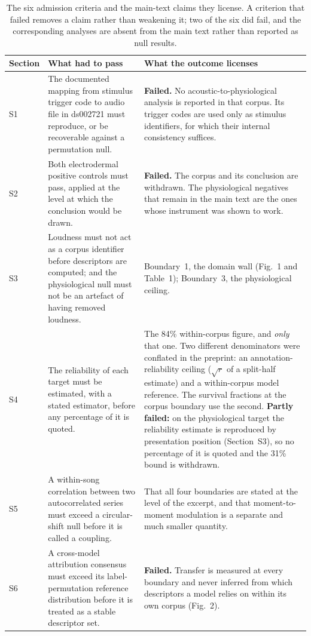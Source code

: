\begin{table}[htbp]
\centering\small
\caption{The six admission criteria and the main-text claims they license. A criterion
that failed removes a claim rather than weakening it; two of the six did fail, and the
corresponding analyses are absent from the main text rather than reported as null
results.}
\begin{tabular}{p{1.0cm}p{5.8cm}p{7.2cm}}
\toprule
Section & What had to pass & What the outcome licenses \\
\midrule
S1 & The documented mapping from stimulus trigger code to audio file in ds002721 must
reproduce, or be recoverable against a permutation null.
& \textbf{Failed.} No acoustic-to-physiological analysis is reported in that corpus.
Its trigger codes are used only as stimulus identifiers, for which their internal
consistency suffices. \\
\addlinespace
S2 & Both electrodermal positive controls must pass, applied at the level
at which the conclusion would be drawn.
& \textbf{Failed.} The corpus and its conclusion are withdrawn. The physiological
negatives that remain in the main text are the ones whose instrument was shown to
work. \\
\addlinespace
S3 & Loudness must not act as a corpus identifier before descriptors are computed; and
the physiological null must not be an artefact of having removed loudness.
& Boundary~1, the domain wall (Fig.~1 and Table~1); Boundary~3, the physiological
ceiling. \\
\addlinespace
S4 & The reliability of each target must be estimated, with a stated estimator, before
any percentage of it is quoted.
& The 84\% within-corpus figure, and \emph{only} that one. Two different denominators
were conflated in the preprint: an annotation-reliability ceiling ($\sqrt{r}$ of a
split-half estimate) and a within-corpus model reference. The survival fractions at the
corpus boundary use the second. \textbf{Partly failed:} on the physiological target the
reliability estimate is reproduced by presentation position (Section~S3), so no
percentage of it is quoted and the 31\% bound is withdrawn. \\
\addlinespace
S5 & A within-song correlation between two autocorrelated series must exceed a
circular-shift null before it is called a coupling.
& That all four boundaries are stated at the level of the excerpt, and that
moment-to-moment modulation is a separate and much smaller quantity. \\
\addlinespace
S6 & A cross-model attribution consensus must exceed its label-permutation reference
distribution before it is treated as a stable descriptor set.
& \textbf{Failed.} Transfer is measured at every boundary and never inferred from
which descriptors a model relies on within its own corpus (Fig.~2). \\
\bottomrule
\end{tabular}
\end{table}

